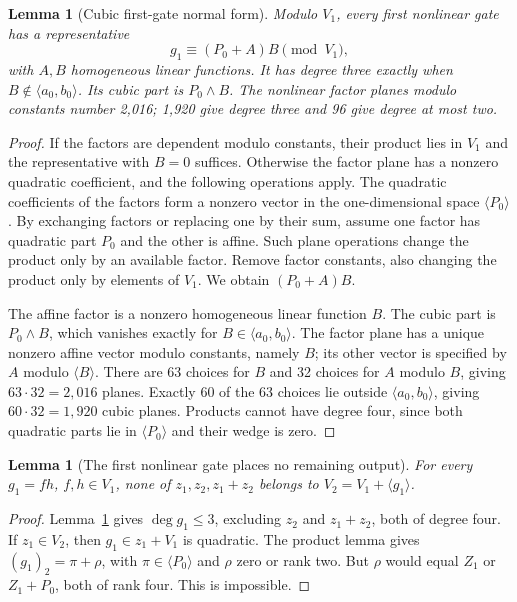 \documentclass[11pt,a4paper]{article}
\theoremstyle{plain}
\newtheorem{lemma}[theorem]{Lemma}
\theoremstyle{remark}
\begin{document}
\begin{lemma}[Cubic first-gate normal form]\label{l1:lem:cubic}
Modulo $V_1$, every first nonlinear gate has a representative
\[
g_1\equiv(P_0+A)B\pmod{V_1},
\]
with $A,B$ homogeneous linear functions. It has degree three exactly when $B\notin\langle a_0,b_0\rangle$. Its cubic part is $P_0\wedge B$. The nonlinear factor planes modulo constants number 2,016; 1,920 give degree three and 96 give degree at most two.
\end{lemma}
\begin{proof}
If the factors are dependent modulo constants, their product lies in $V_1$ and the representative with $B=0$ suffices. Otherwise the factor plane has a nonzero quadratic coefficient, and the following operations apply. 
The quadratic coefficients of the factors form a nonzero vector in the one-dimensional space $\langle P_0\rangle$. By exchanging factors or replacing one by their sum, assume one factor has quadratic part $P_0$ and the other is affine. Such plane operations change the product only by an available factor. Remove factor constants, also changing the product only by elements of $V_1$. We obtain $(P_0+A)B$.

The affine factor is a nonzero homogeneous linear function $B$. The cubic part is $P_0\wedge B$, which vanishes exactly for $B\in\langle a_0,b_0\rangle$. The factor plane has a unique nonzero affine vector modulo constants, namely $B$; its other vector is specified by $A$ modulo $\langle B\rangle$. There are 63 choices for $B$ and 32 choices for $A$ modulo $B$, giving $63\cdot32=2,016$ planes. Exactly 60 of the 63 choices lie outside $\langle a_0,b_0\rangle$, giving $60\cdot32=1,920$ cubic planes. Products cannot have degree four, since both quadratic parts lie in $\langle P_0\rangle$ and their wedge is zero.
\end{proof}

\begin{lemma}[The first nonlinear gate places no remaining output]\label{l1:lem:first}
For every $g_1=fh$, $f,h\in V_1$, none of $z_1,z_2,z_1+z_2$ belongs to $V_2=V_1+\langle g_1\rangle$.
\end{lemma}
\begin{proof}
Lemma~\ref{l1:lem:cubic} gives $\deg g_1\le3$, excluding $z_2$ and $z_1+z_2$, both of degree four. If $z_1\in V_2$, then $g_1\in z_1+V_1$ is quadratic. The product lemma gives $(g_1)_2=\pi+\rho$, with $\pi\in\langle P_0\rangle$ and $\rho$ zero or rank two. But $\rho$ would equal $Z_1$ or $Z_1+P_0$, both of rank four. This is impossible.
\end{proof}
\end{document}
